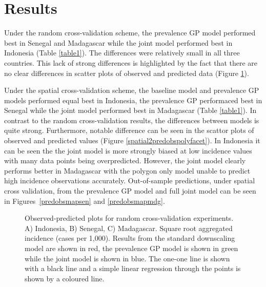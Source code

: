 \documentclass{statsoc}
\begin{document}
\section*{Results}


Under the random cross-validation scheme, the prevalence GP model performed best in Senegal and Madagascar while the joint model performed best in Indonesia (Table \ref{table1}).
The differences were relatively small in all three countries.
This lack of strong differences is highlighted by the fact that there are no clear differences in scatter plots of observed and predicted data (Figure \ref{randompredobspolyfacet}).




Under the spatial cross-validation scheme, the baseline model and prevalence GP models performed equal best in Indonesia, the prevalence GP performaced best in Senegal while the joint model performed best in Madagascar (Table \ref{table1}).
In contrast to the random cross-validation results, the differences between models is quite strong.
Furthermore, notable difference can be seen in the scattor plots of observed and predicted values (Figure \ref{spatial2predobspolyfacet}).
In Indonesia it can be seen the the joint model is more strongly biased at low incidence values with many data points being overpredicted.
However, the joint model clearly performs better in Madagascar with the polygon only model unable to predict high incidence observations accurately.
Out-of-sample predictions, under spatial cross validation, from the prevalence GP model and full joint model can be seen in Figures~\ref{predobsmapsen} and \ref{predobsmapmdg}.

\begin{figure}
\caption{\label{randompredobspolyfacet} 
Observed-predicted plots for random cross-validation experiments.
A) Indonesia, B) Senegal, C) Madagascar. Square root aggregated incidence (cases per 1,000).
Results from the standard downscaling model are shown in red, the prevalence GP model is shown in green while the joint model is shown in blue.
The one-one line is shown with a black line and a simple linear regression through the points is shown by a coloured line.
}

\end{figure}
\end{document}
